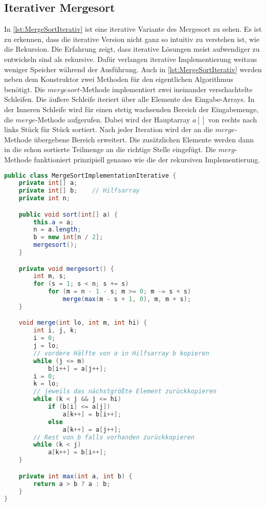 \subsection{Iterativer Mergesort}

In \autoref{lst:MergeSortIterativ} ist eine iterative Variante des Mergesort zu sehen. Es ist zu erkennen, dass die iterative Version nicht ganz so intuitiv zu verstehen ist, wie die Rekursion. Die Erfahrung zeigt, dass iterative Lösungen meist aufwendiger zu entwickeln sind als rekursive. Dafür verlangen iterative Implementierung weitaus weniger Speicher während der Ausführung. Auch in \autoref{lst:MergeSortIterativ} werden neben dem Konstruktor zwei Methoden für den eigentlichen Algorithmus benötigt. Die $mergesort$-Methode implementiert zwei ineinander verschachtelte Schleifen. Die äußere Schleife iteriert über alle Elemente des Eingabe-Arrays. In der Inneren Schleife wird für einen stetig wachsenden Bereich der Eingabemenge, die $merge$-Methode aufgerufen. Dabei wird der Hauptarray $a[]$ von rechts nach links Stück für Stück sortiert. Nach jeder Iteration wird der an  die $merge$-Methode übergebene Bereich erweitert. Die zusätzlichen Elemente werden dann in die schon sortierte Teilmenge an die richtige Stelle eingefügt. Die $merg$-Methode funktioniert prinzipiell genauso wie die der rekursiven Implementierung.

\begin{lstlisting}[language=java,caption={iterativer Mergesort (Quelle: \cite{MergeSortIterativ})},label=lst:MergeSortIterativ]
public class MergeSortImplementationIterative {
    private int[] a;
    private int[] b;    // Hilfsarray
    private int n;

    public void sort(int[] a) {
        this.a = a;
        n = a.length;
        b = new int[n / 2];
        mergesort();
    }

    private void mergesort() {
        int m, s;
        for (s = 1; s < n; s += s)
            for (m = n - 1 - s; m >= 0; m -= s + s)
                merge(max(m - s + 1, 0), m, m + s);
    }

    void merge(int lo, int m, int hi) {
        int i, j, k;
        i = 0;
        j = lo;
        // vordere Hälfte von a in Hilfsarray b kopieren
        while (j <= m)
            b[i++] = a[j++];
        i = 0;
        k = lo;
        // jeweils das nächstgrößte Element zurückkopieren
        while (k < j && j <= hi)
            if (b[i] <= a[j])
                a[k++] = b[i++];
            else
                a[k++] = a[j++];
        // Rest von b falls vorhanden zurückkopieren
        while (k < j)
            a[k++] = b[i++];
    }

    private int max(int a, int b) {
        return a > b ? a : b;
    }
}
\end{lstlisting}
